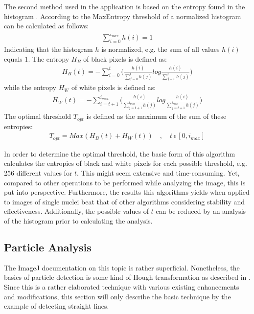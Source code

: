 \documentclass[a4paper, 12pt]{article}
\begin{document}
The second method used in the application is based on the entropy found in the
histogram \cite{kapur84}. According to \cite{fiji04} the MaxEntropy threshold of
a normalized histogram can be calculated as follows:
\begin{align*}
\sum_{i=0}^{i_{max}} h(i) = 1
\end{align*}
Indicating that the histogram $h$ is normalized, e.g. the sum of all
values $h(i)$ equals $1$. The entropy  $H_B$ of black pixels is defined as:
\begin{align*}
H_B(t) = - \sum_{i=0}^{t} \Bigg(\frac{h(i)}{ \sum_{j=0}^{t} h(j)}
log \frac{h(i)}{ \sum_{j=0}^{t} h(j)}\Bigg)
\end{align*}
while the entropy $H_W$ of white pixels is defined as:
\begin{align*}
H_W(t) = - \sum_{i=t+1}^{i_{max}} \Bigg(\frac{h(i)}{ \sum_{j=t+1}^{i_{max}}
h(j)} log
\frac{h(i)}{ \sum_{j=t+1}^{i_{max}} h(j)}\Bigg)
\end{align*}
The optimal threshold $T_{opt}$ is defined as the maximum of the sum of these
entropies:
\begin{align*}
T_{opt}=Max(H_B(t)+H_W(t)) \quad , \quad t \, \epsilon \, [0, i_{max}]
\end{align*}

In order to determine the optimal threshold, the basic form of this algorithm
calculates the entropies of black and white pixels for each possible threshold, e.g. 256
different values for $t$. This might seem extensive and time-consuming. Yet,
compared to other operations to be performed while analyzing the image, this is
put into perspective. Furthermore, the results this algorithms yields when
applied to images of single nuclei beat that of other algorithms considering
stability and effectiveness. Additionally, the possible values of $t$ can be
reduced by an analysis of the histogram prior to calculating the analysis.

\subsection{Particle Analysis}\label{sec:particle_analysis}

The ImageJ documentation on this topic is rather superficial. Nonetheless, the
basics of particle detection is some kind of Hough transformation as described
in \cite{duda71}. Since this is a rather elaborated technique with various
existing enhancements and modifications, this section will only describe the
basic technique by the example of detecting straight lines.
\end{document}
